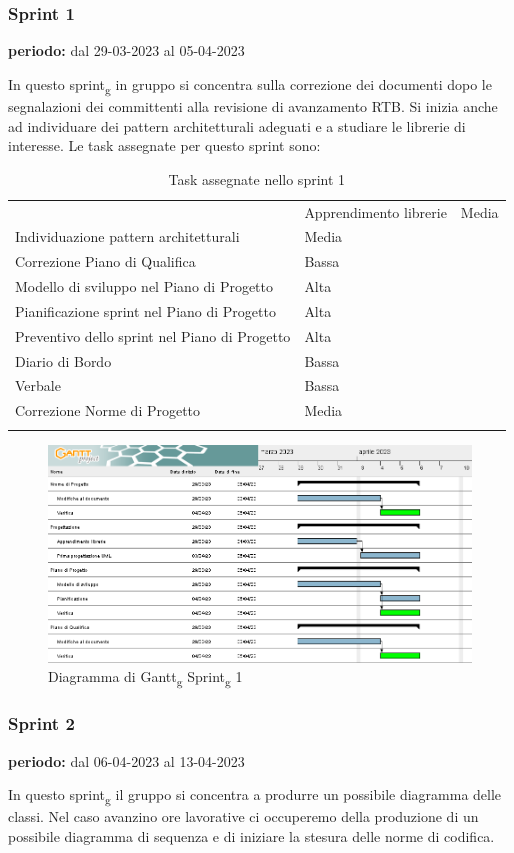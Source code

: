\subsubsection{Sprint 1}
\begin{center}
\textbf{periodo:} dal 29-03-2023 al 05-04-2023\\
\end{center}
In questo sprint\textsubscript{g} in gruppo si concentra sulla correzione dei documenti dopo le segnalazioni dei committenti alla revisione di avanzamento RTB.
Si inizia anche ad individuare dei pattern architetturali adeguati e a studiare le librerie di interesse. Le task assegnate per questo sprint sono:
\begin{longtable}{ 
	>{\centering}M{0.30\textwidth} 
	>{\centering}M{0.10\textwidth}
	}
	\rowcolorhead
	\centering 
	 &	
	\endfirsthead	
	\endhead
	
	Apprendimento librerie & Media \tabularnewline
	Individuazione pattern architetturali & Media \tabularnewline
	Correzione Piano di Qualifica & Bassa \tabularnewline
	Modello di sviluppo nel Piano di Progetto & Alta \tabularnewline
	Pianificazione sprint nel Piano di Progetto & Alta \tabularnewline
	Preventivo dello sprint nel Piano di Progetto & Alta \tabularnewline
	Diario di Bordo & Bassa \tabularnewline
	Verbale & Bassa \tabularnewline
	Correzione Norme di Progetto & Media \tabularnewline
	\captionline \caption{Task assegnate nello sprint 1}
\end{longtable}


\begin{figure}[H]
    \centering
    \includegraphics[scale=0.56]{image/gantt_sprint1.PNG}
    \caption{Diagramma di Gantt\textsubscript{g} Sprint\textsubscript{g} 1}
\end{figure}

\subsubsection{Sprint 2}
\begin{center}
\textbf{periodo:} dal 06-04-2023 al 13-04-2023\\
\end{center}
In questo sprint\textsubscript{g} il gruppo si concentra a produrre un possibile diagramma delle classi. 
Nel caso avanzino ore lavorative ci occuperemo della produzione di un possibile diagramma di sequenza e di iniziare la stesura delle norme
di codifica.

